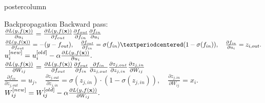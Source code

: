 \documentclass{beamer}
\begin{document}
\begin{frame}[fragile]{}
\begin{columns}
\begin{column}{.31\textwidth}
\begin{beamercolorbox}[center]{postercolumn}
\begin{minipage}{.98\textwidth}
{\begin{myblock}{Backpropagation}
  Backward pass:\\
  $\frac{\partial L\left(y, f(\mathbf{x})\right)}{\partial u_i} = \frac{\partial L\left(y, f(\mathbf{x})\right)}{\partial f_{out}}\frac{\partial f_{out}}{\partial f_{in}}\frac{\partial f_{in}}{\partial u_i}$\\
  $\frac{\partial \Lxy}{\partial f_{out}} = -(y-f_{out}), \quad \frac{\partial f_{out}}{\partial f_{in}} = \sigma(f_{in})·(1-\sigma(f_{in})), \quad \frac{\partial f_{in}}{\partial u_i} = z_{i,out}.$\\
  $u^{[new]}_i = u^{[old]}_i - \alpha \frac{\partial L\left(y, f(\mathbf{x})\right)}{\partial u_i}.$\\
  $\frac{\partial L\left(y, f(\mathbf{x})\right)}{\partial W_{ij}} = \frac{\partial L\left(y, f(\mathbf{x})\right)}{\partial f_{out}}\frac{\partial f_{out}}{\partial f_{in}}\frac{\partial f_{in}}{\partial z_{j,out}}\frac{\partial z_{j,out}}{\partial z_{j,in}}\frac{\partial z_{j,in}}{\partial W_{ij}}$\\
  $\frac{\partial f_{in}}{\partial z_{j,out}}=u_j, \quad \frac{\partial z_{j,out}}{\partial z_{j,in}}=\sigma(z_{j,in})·(1-\sigma(z_{j,in})), \quad \frac{\partial z_{j,in}}{\partial W_{ij}}=x_i.$\\
  $W^{[new]}_{ij} = W^{[old]}_{ij} - \alpha \frac{\partial L\left(y, f(\mathbf{x})\right)}{\partial W_{ij}}.$\\  
\end{myblock}
  }
  
  \end{minipage}
  \end{beamercolorbox}
  \end{column}
  
  
  
\end{columns}
\end{frame}
\end{document}
